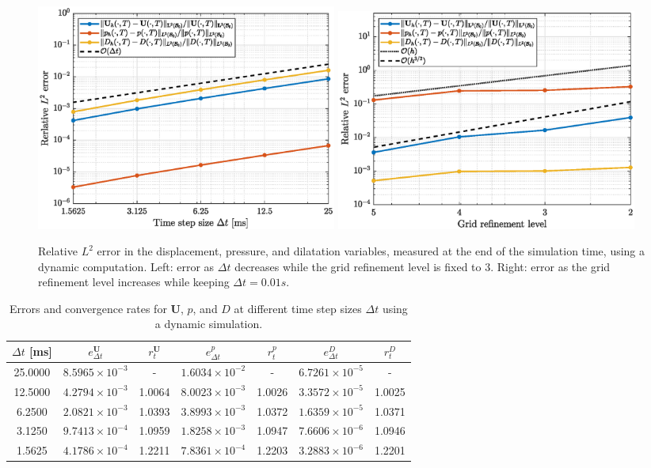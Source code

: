 \documentclass{sfuthesis}
\numberwithin{equation}{section}
\numberwithin{figure}{chapter}
\numberwithin{table}{chapter}
\theoremstyle{definition}
\def\*#1{{\mathbf{#1}}} %
\begin{document}
\begin{figure}
    \centering
    \includegraphics[width=0.48\textwidth]{convergence-study-time.eps}
    \includegraphics[width=0.48\textwidth]{convergence-study-space.eps}
    \caption{Relative $L^2$ error in the displacement, pressure, and dilatation variables, measured at the end of the simulation time, using a dynamic computation. Left: error as $\Delta t$ decreases while the grid refinement level is fixed to 3. Right: error as the grid refinement level increases while keeping $\Delta t = 0.01 \unit{s}$.\label{fig:convergence_dynamic}}
\end{figure}

\begin{table}
\centering
\small
\begin{tabular}{ccccccc}
\hline
$\Delta t$ [ms] &  $e_{\Delta t}^{\*U}$ & $r_{t}^\*U$ & $e_{\Delta t}^{p}$ & $r_{t}^p$  & $e_{\Delta t}^{D}$ & $r_{t}^D$  \\
\hline
25.0000  & $8.5965 \times 10^{-3}$ & -       & $1.6034 \times 10^{-2}$ & -       & $6.7261 \times 10^{-5}$ & - \\
12.5000  & $4.2794 \times 10^{-3}$ & 1.0064  & $8.0023 \times 10^{-3}$ & 1.0026  & $3.3572 \times 10^{-5}$ & 1.0025 \\
6.2500   & $2.0821 \times 10^{-3}$ & 1.0393  & $3.8993 \times 10^{-3}$ & 1.0372  & $1.6359 \times 10^{-5}$ & 1.0371 \\
3.1250   & $9.7413 \times 10^{-4}$ & 1.0959  & $1.8258 \times 10^{-3}$ & 1.0947  & $7.6606 \times 10^{-6}$ & 1.0946 \\
1.5625   & $4.1786 \times 10^{-4}$ & 1.2211  & $7.8361 \times 10^{-4}$ & 1.2203  & $3.2883 \times 10^{-6}$ & 1.2201 \\
\hline
\end{tabular}
\caption{Errors and convergence rates for $\*U$, $p$, and $D$ at different time step sizes $\Delta t$ using a dynamic simulation.\label{tab:errors_rates_time}}
\end{table}
\end{document}
